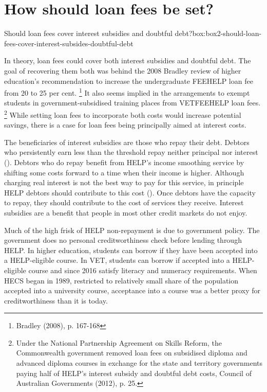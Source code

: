 \documentclass[embargoed]{grattan}
\begin{document}
{\section{How should loan fees be set?}\label{how-should-loan-fees-be-set}


\begin{bigbox*}{Should loan fees cover interest subsidies and doubtful debt?}{box:box2-should-loan-fees-cover-interest-subsides-doubtful-debt}

In theory, loan fees could cover both interest subsidies and doubtful debt.
The goal of recovering them both was behind the 2008 Bradley review of higher education's recommendation to increase the undergraduate \gls{FEEHELP} loan fee from 20 to 25 per cent.%
\footnote{Bradley (2008), p. 167-168} It also seems implied in the arrangements to exempt students in government-subsidised training places from \gls{VETFEEHELP} loan fees.%
\footnote{Under the National Partnership Agreement on Skills Reform, the Commonwealth government removed loan fees on subsidised diploma and advanced diploma courses in exchange for the state and territory governments paying half of \gls{HELP}'s interest subsidy and doubtful debt costs, Council of Australian Governments (2012), p. 25.} While setting loan fees to incorporate both costs would increase potential savings, there is a case for loan fees being principally aimed at interest costs.

The beneficiaries of interest subsidies are those who repay their debt.
Debtors who persistently earn less than the threshold repay neither principal nor interest ().
Debtors who do repay benefit from \gls{HELP}'s income smoothing service by shifting some costs forward to a time when their income is higher.
Although charging real interest is not the best way to pay for this service, in principle \gls{HELP} debtors should contribute to this cost ().
Once debtors have the capacity to repay, they should contribute to the cost of services they receive.
Interest subsidies are a benefit that people in most other credit markets do not enjoy.

Much of the high frisk of \gls{HELP} non-repayment is due to government policy.
The government does no personal creditworthiness check before lending through \gls{HELP}.
In higher education, students can borrow if they have been accepted into a \gls{HELP}-eligible course.
In VET, students can borrow if accepted into a \gls{HELP}-eligible course and since 2016 satisfy literacy and numeracy requirements.
When \gls{HECS} began in 1989, restricted to relatively small share of the population accepted into a university course, acceptance into a course was a better proxy for creditworthiness than it is today.


\end{bigbox*}}
\end{document}
